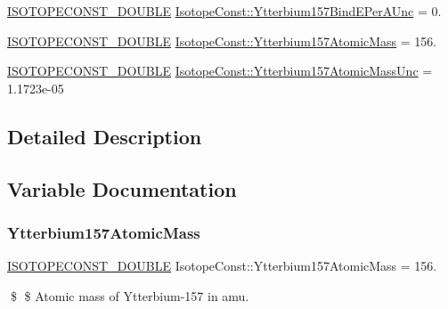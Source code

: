 \begin{DoxyCompactItemize}
\mbox{\hyperlink{group___isotope_const-_macros_ga8f45a7272ce02c0b4c65c44636ed719a}{I\+S\+O\+T\+O\+P\+E\+C\+O\+N\+S\+T\+\_\+\+D\+O\+U\+B\+LE}} \mbox{\hyperlink{group___isotope_const-_ytterbium-_yb157_gabe997f861038ace75d76962f18ee03bd}{Isotope\+Const\+::\+Ytterbium157\+Bind\+E\+Per\+A\+Unc}} = 0.
\item 
\mbox{\hyperlink{group___isotope_const-_macros_ga8f45a7272ce02c0b4c65c44636ed719a}{I\+S\+O\+T\+O\+P\+E\+C\+O\+N\+S\+T\+\_\+\+D\+O\+U\+B\+LE}} \mbox{\hyperlink{group___isotope_const-_ytterbium-_yb157_ga64b001d6226dad8e54f095af166853a0}{Isotope\+Const\+::\+Ytterbium157\+Atomic\+Mass}} = 156.
\item 
\mbox{\hyperlink{group___isotope_const-_macros_ga8f45a7272ce02c0b4c65c44636ed719a}{I\+S\+O\+T\+O\+P\+E\+C\+O\+N\+S\+T\+\_\+\+D\+O\+U\+B\+LE}} \mbox{\hyperlink{group___isotope_const-_ytterbium-_yb157_ga5de3e3f2c4a9059b96157fe996f7a198}{Isotope\+Const\+::\+Ytterbium157\+Atomic\+Mass\+Unc}} = 1.\+1723e-\/05
\end{DoxyCompactItemize}


\subsection{Detailed Description}


\subsection{Variable Documentation}
\mbox{\label{group___isotope_const-_ytterbium-_yb157_ga64b001d6226dad8e54f095af166853a0}} 
\subsubsection{\texorpdfstring{Ytterbium157\+Atomic\+Mass}{Ytterbium157AtomicMass}}
{\footnotesize\ttfamily \mbox{\hyperlink{group___isotope_const-_macros_ga8f45a7272ce02c0b4c65c44636ed719a}{I\+S\+O\+T\+O\+P\+E\+C\+O\+N\+S\+T\+\_\+\+D\+O\+U\+B\+LE}} Isotope\+Const\+::\+Ytterbium157\+Atomic\+Mass = 156.}

\$ \$ Atomic mass of Ytterbium-\/157 in amu. \mbox{\label{group___isotope_const-_ytterbium-_yb157_ga5de3e3f2c4a9059b96157fe996f7a198}} 
